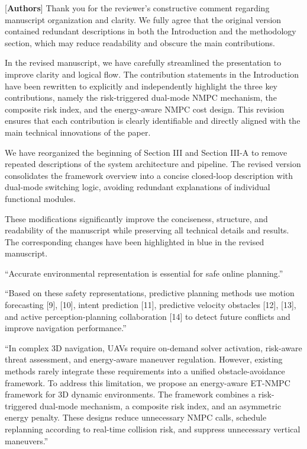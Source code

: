 \documentclass[12pt, twosides]{article}
\theoremstyle{definition}
\begin{document}
\textcolor[rgb]{0.00,0.00,1.00}{[\textbf{Authors}]} Thank you for the reviewer's constructive comment regarding manuscript organization and clarity. We fully agree that the original version contained redundant descriptions in both the Introduction and the methodology section, which may reduce readability and obscure the main contributions.

In the revised manuscript, we have carefully streamlined the presentation to improve clarity and logical flow. The contribution statements in the Introduction have been rewritten to explicitly and independently highlight the three key contributions, namely the risk-triggered dual-mode NMPC mechanism, the composite risk index, and the energy-aware NMPC cost design. This revision ensures that each contribution is clearly identifiable and directly aligned with the main technical innovations of the paper.

We have reorganized the beginning of Section III and Section III-A to remove repeated descriptions of the system architecture and pipeline. The revised version consolidates the framework overview into a concise closed-loop description with dual-mode switching logic, avoiding redundant explanations of individual functional modules.

These modifications significantly improve the conciseness, structure, and readability of the manuscript while preserving all technical details and results. The corresponding changes have been highlighted in blue in the revised manuscript.

``Accurate environmental representation is essential for safe online planning.'' 

``Based on these safety representations, predictive planning methods use motion forecasting [9], [10], intent prediction [11], predictive velocity obstacles [12], [13], and active perception-planning collaboration [14] to detect future conflicts and improve navigation performance.'' 

``In complex 3D navigation, UAVs require on-demand solver activation, risk-aware threat assessment, and energy-aware maneuver regulation. However, existing methods rarely integrate these requirements into a unified obstacle-avoidance framework. To address this limitation, we propose an energy-aware ET-NMPC framework for 3D dynamic environments. The framework combines a risk-triggered dual-mode mechanism, a composite risk index, and an asymmetric energy penalty. These designs reduce unnecessary NMPC calls, schedule replanning according to real-time collision risk, and suppress unnecessary vertical maneuvers.'' 
\end{document}
